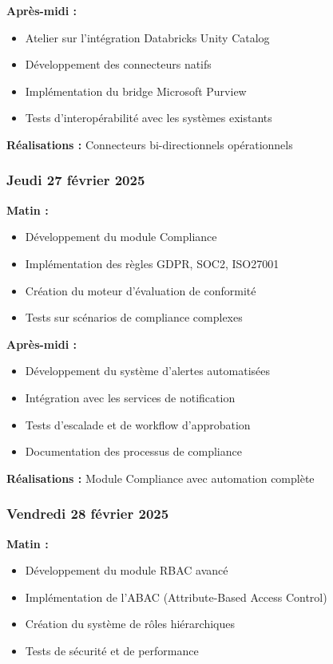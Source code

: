 \documentclass[a4paper,12pt]{article}
\begin{document}
\textbf{Après-midi :}
\begin{itemize}
    \item Atelier sur l'intégration Databricks Unity Catalog
    \item Développement des connecteurs natifs
    \item Implémentation du bridge Microsoft Purview
    \item Tests d'interopérabilité avec les systèmes existants
\end{itemize}

\textbf{Réalisations :} Connecteurs bi-directionnels opérationnels

\subsubsection*{Jeudi 27 février 2025}
\textbf{Matin :}
\begin{itemize}
    \item Développement du module Compliance
    \item Implémentation des règles GDPR, SOC2, ISO27001
    \item Création du moteur d'évaluation de conformité
    \item Tests sur scénarios de compliance complexes
\end{itemize}

\textbf{Après-midi :}
\begin{itemize}
    \item Développement du système d'alertes automatisées
    \item Intégration avec les services de notification
    \item Tests d'escalade et de workflow d'approbation
    \item Documentation des processus de compliance
\end{itemize}

\textbf{Réalisations :} Module Compliance avec automation complète

\subsubsection*{Vendredi 28 février 2025}
\textbf{Matin :}
\begin{itemize}
    \item Développement du module RBAC avancé
    \item Implémentation de l'ABAC (Attribute-Based Access Control)
    \item Création du système de rôles hiérarchiques
    \item Tests de sécurité et de performance
\end{itemize}
\end{document}
